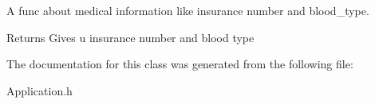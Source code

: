 A func about medical information like insurance number and blood\+\_\+type. 

\begin{DoxyReturn}{Returns}
Gives u insurance number and blood type 
\end{DoxyReturn}


The documentation for this class was generated from the following file\+:\begin{DoxyCompactItemize}
\item 
Application.\+h\end{DoxyCompactItemize}
